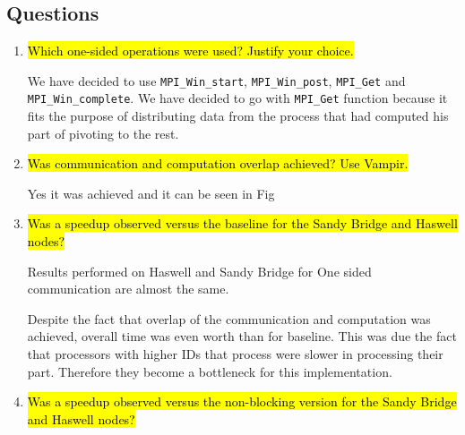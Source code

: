 \subsection{Questions}
\begin{enumerate}
  \item \hl{Which one-sided operations were used? Justify your choice.}

    We have decided to use \verb!MPI_Win_start!, \verb!MPI_Win_post!, \verb!MPI_Get! and \verb!MPI_Win_complete!.
    We have decided to go with \verb!MPI_Get! function because it fits the purpose of distributing
    data from the process that had computed his part of pivoting to the rest.

  \item \hl{Was communication and computation overlap achieved? Use Vampir.}

    Yes it was achieved and it can be seen in Fig 

  \item \hl{Was a speedup observed versus the baseline for the Sandy Bridge and Haswell nodes?}

    Results performed on Haswell and Sandy Bridge for One sided communication are almost the same.
  
    Despite the fact that overlap of the communication and computation was achieved, overall time
    was even worth than for baseline. This was due the fact that processors with higher 
    IDs that process were slower in processing their part. Therefore they become a bottleneck
    for this implementation.

  \item \hl{Was a speedup observed versus the non-blocking version for the Sandy Bridge and Haswell nodes?}


\end{enumerate}
